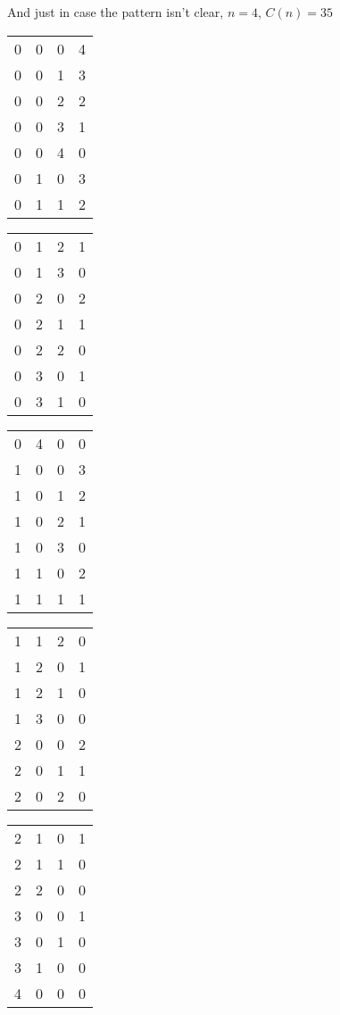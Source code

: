\documentclass{article}
\begin{document}
\newpage

And just in case the pattern isn't clear, $n=4$, $C(n)=35$
\begin{center}
\begin{tabular}{c c c c}
0 & 0 & 0 & 4 \\
0 & 0 & 1 & 3 \\
0 & 0 & 2 & 2 \\
0 & 0 & 3 & 1 \\
0 & 0 & 4 & 0 \\
0 & 1 & 0 & 3 \\
0 & 1 & 1 & 2
\end{tabular}
\qquad
\begin{tabular}{c c c c}
0 & 1 & 2 & 1 \\
0 & 1 & 3 & 0 \\
0 & 2 & 0 & 2 \\
0 & 2 & 1 & 1 \\
0 & 2 & 2 & 0 \\
0 & 3 & 0 & 1 \\
0 & 3 & 1 & 0
\end{tabular}
\qquad
\begin{tabular}{c c c c}
0 & 4 & 0 & 0 \\
1 & 0 & 0 & 3 \\
1 & 0 & 1 & 2 \\
1 & 0 & 2 & 1 \\
1 & 0 & 3 & 0 \\
1 & 1 & 0 & 2 \\
1 & 1 & 1 & 1
\end{tabular}
\qquad
\begin{tabular}{c c c c}
1 & 1 & 2 & 0 \\
1 & 2 & 0 & 1 \\
1 & 2 & 1 & 0 \\
1 & 3 & 0 & 0 \\
2 & 0 & 0 & 2 \\
2 & 0 & 1 & 1 \\
2 & 0 & 2 & 0
\end{tabular}
\qquad
\begin{tabular}{c c c c}
2 & 1 & 0 & 1 \\
2 & 1 & 1 & 0 \\
2 & 2 & 0 & 0 \\
3 & 0 & 0 & 1 \\
3 & 0 & 1 & 0 \\
3 & 1 & 0 & 0 \\
4 & 0 & 0 & 0
\end{tabular}
\end{center}
\end{document}
